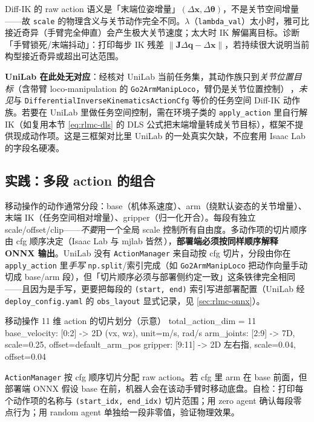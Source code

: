 Diff-IK 的 raw action 语义是「末端位姿增量」$(\Delta\mathbf x,\Delta\boldsymbol\theta)$，不是关节空间增量——故 \verb|scale| 的物理含义与关节动作完全不同。$\lambda$（\verb|lambda_val|）太小时，雅可比接近奇异（手臂完全伸直）会产生极大关节速度；太大时 IK 解偏离目标。诊断「手臂锁死/末端抖动」：打印每步 IK 残差 $\lVert\mathbf J\Delta\mathbf q-\Delta\mathbf x\rVert$，若持续很大说明当前构型接近奇异或超出可达范围。

\textbf{UniLab 在此处无对应}：经核对 UniLab 当前任务集，其动作族只到\emph{关节位置目标}（含带臂 loco-manipulation 的 \verb|Go2ArmManipLoco|，臂仍是关节位置控制）\,\cite{unilab2026}，\emph{未见}与 \verb|DifferentialInverseKinematicsActionCfg| 等价的任务空间 Diff-IK 动作族。若要在 UniLab 里做任务空间控制，需在环境子类的 \verb|apply_action| 里自行解 IK（如复用本节 \cref{eq:rlmc-dls} 的 DLS 公式把末端增量转成关节目标），框架不提供现成动作项。这是三框架对比里 UniLab 的一处真实欠缺，不应套用 Isaac Lab 的字段名硬凑。

\subsection{实践：多段 action 的组合}
\label{sec:rlmc-multiaction}

移动操作的动作通常分段：base（机体系速度）、arm（绕默认姿态的关节增量）、末端 IK（任务空间相对增量）、gripper（归一化开合）。每段有独立 scale/offset/clip——\emph{不要}用一个全局 scale 控制所有自由度。多动作项的切片顺序由 cfg 顺序决定（Isaac Lab 与 mjlab 皆然\,\cite{isaaclab2024,mjlab2026}），\textbf{部署端必须按同样顺序解释 ONNX 输出}。UniLab 没有 \verb|ActionManager| 来自动按 cfg 切片，分段由你在 \verb|apply_action| 里\emph{手写} \verb|np.split|/索引完成（如 \verb|Go2ArmManipLoco| 把动作向量手动切成 base/arm 段），但「切片顺序必须与部署侧约定一致」这条铁律完全相同——且因为是手写，更要把每段的 \verb|(start, end)| 索引写进部署配置（UniLab 经 \verb|deploy_config.yaml| 的 \verb|obs_layout| 显式记录，见 \cref{sec:rlmc-onnx}）。

\begin{codebox}[text]{移动操作 11 维 action 的切片划分（示意）}
total_action_dim = 11
  base_velocity:  [0:2]  -> 2D (vx, wz),  unit=m/s, rad/s
  arm_joints:     [2:9]  -> 7D, scale=0.25, offset=default_arm_pos
  gripper:        [9:11] -> 2D 左右指, scale=0.04, offset=0.04
\end{codebox}

\begin{pitfall}[搞错 term 顺序 = 全盘错配]
\verb|ActionManager| 按 cfg 顺序切片分配 raw action。若 cfg 里 arm 在 base 前面，但部署端 ONNX 假设 base 在前，机器人会在该动手臂时移动底盘。自检：打印每个动作项的名称与 \verb|(start_idx, end_idx)| 切片范围；用 zero agent 确认每段零点行为；用 random agent 单独给一段非零值，验证物理效果。
\end{pitfall}


